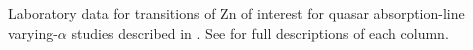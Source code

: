 Laboratory data for transitions of Zn of interest for quasar absorption-line varying-$\alpha$ studies described in . See  for full descriptions of each column.
